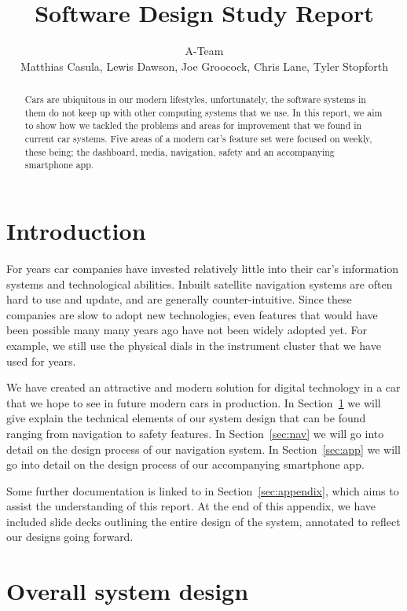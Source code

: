 \documentclass{article}
\title{Software Design Study Report}
\author{A-Team\\Matthias Casula, Lewis Dawson, Joe Groocock, Chris Lane, Tyler Stopforth}
\begin{document}
\maketitle

\pagebreak
\tableofcontents
\pagebreak

\begin{abstract}
  Cars are ubiquitous in our modern lifestyles, unfortunately, the software systems in them do not keep up with other computing systems that we use. In this report, we aim to show how we tackled the problems and areas for improvement that we found in current car systems. Five areas of a modern car's feature set were focused on weekly, these being; the dashboard, media, navigation, safety and an accompanying smartphone app.
\end{abstract}


\section*{Introduction}
For years car companies have invested relatively little into their car's information systems and technological abilities. Inbuilt satellite navigation systems are often hard to use and update, and are generally counter-intuitive. Since these companies are slow to adopt new technologies, even features that would have been possible many many years ago have not been widely adopted yet. For example, we still use the physical dials in the instrument cluster that we have used for years.

We have created an attractive and modern solution for digital technology in a car that we hope to see in future modern cars in production. In Section~\ref{sec:system-design} we will give explain the technical elements of our system design that can be found ranging from navigation to safety features. In Section~\ref{sec:nav} we will go into detail on the design process of our navigation system. In Section~\ref{sec:app} we will go into detail on the design process of our accompanying smartphone app.

Some further documentation is linked to in Section~\ref{sec:appendix}, which aims to assist the understanding of this report. At the end of this appendix, we have included slide decks outlining the entire design of the system, annotated to reflect our designs going forward.

\section{Overall system design}\label{sec:system-design}
\end{document}
